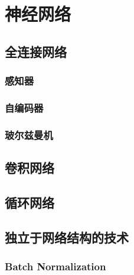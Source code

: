\chapter{神经网络} %
\label{cha:神经网络}

\section{全连接网络} %
\label{sec:全连接网络}
\subsection{感知器} %
\label{sub:感知器}

\subsection{自编码器} %
\label{sub:自编码器}

\subsection{玻尔兹曼机} %
\label{sub:玻尔兹曼机}




\section{卷积网络} %
\label{sec:卷积网络}


\section{循环网络} %
\label{sec:循环网络}


\section{独立于网络结构的技术} %
\label{sec:独立于网络结构的技术}
\subsection{Batch Normalization} %
\label{sub:batch_normalization}


